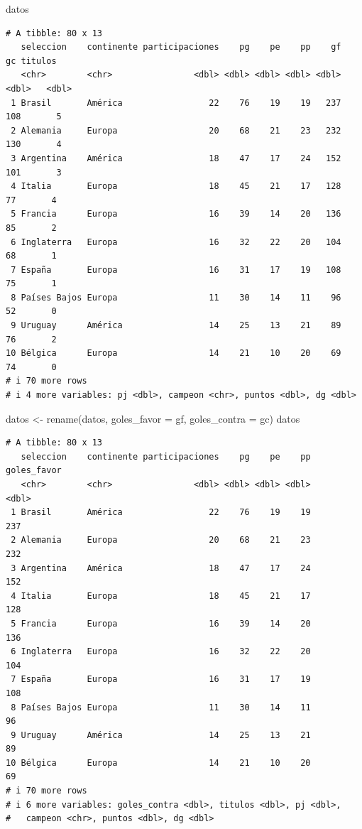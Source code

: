 \documentclass[
]{book}
\newenvironment{Shaded}{\begin{snugshade}}{\end{snugshade}}
\newcommand{\AttributeTok}[1]{\textcolor[rgb]{0.77,0.63,0.00}{#1}}
\newcommand{\FunctionTok}[1]{\textcolor[rgb]{0.00,0.00,0.00}{#1}}
\newcommand{\NormalTok}[1]{#1}
\newcommand{\OtherTok}[1]{\textcolor[rgb]{0.56,0.35,0.01}{#1}}
\begin{document}
\begin{Shaded}
\begin{Highlighting}[]
\NormalTok{datos}
\end{Highlighting}
\end{Shaded}

\begin{verbatim}
# A tibble: 80 x 13
   seleccion    continente participaciones    pg    pe    pp    gf    gc titulos
   <chr>        <chr>                <dbl> <dbl> <dbl> <dbl> <dbl> <dbl>   <dbl>
 1 Brasil       América                 22    76    19    19   237   108       5
 2 Alemania     Europa                  20    68    21    23   232   130       4
 3 Argentina    América                 18    47    17    24   152   101       3
 4 Italia       Europa                  18    45    21    17   128    77       4
 5 Francia      Europa                  16    39    14    20   136    85       2
 6 Inglaterra   Europa                  16    32    22    20   104    68       1
 7 España       Europa                  16    31    17    19   108    75       1
 8 Países Bajos Europa                  11    30    14    11    96    52       0
 9 Uruguay      América                 14    25    13    21    89    76       2
10 Bélgica      Europa                  14    21    10    20    69    74       0
# i 70 more rows
# i 4 more variables: pj <dbl>, campeon <chr>, puntos <dbl>, dg <dbl>
\end{verbatim}

\begin{Shaded}
\begin{Highlighting}[]
\NormalTok{datos }\OtherTok{\textless{}{-}} \FunctionTok{rename}\NormalTok{(datos, }\AttributeTok{goles\_favor =}\NormalTok{ gf, }\AttributeTok{goles\_contra =}\NormalTok{ gc)}
\NormalTok{datos}
\end{Highlighting}
\end{Shaded}

\begin{verbatim}
# A tibble: 80 x 13
   seleccion    continente participaciones    pg    pe    pp goles_favor
   <chr>        <chr>                <dbl> <dbl> <dbl> <dbl>       <dbl>
 1 Brasil       América                 22    76    19    19         237
 2 Alemania     Europa                  20    68    21    23         232
 3 Argentina    América                 18    47    17    24         152
 4 Italia       Europa                  18    45    21    17         128
 5 Francia      Europa                  16    39    14    20         136
 6 Inglaterra   Europa                  16    32    22    20         104
 7 España       Europa                  16    31    17    19         108
 8 Países Bajos Europa                  11    30    14    11          96
 9 Uruguay      América                 14    25    13    21          89
10 Bélgica      Europa                  14    21    10    20          69
# i 70 more rows
# i 6 more variables: goles_contra <dbl>, titulos <dbl>, pj <dbl>,
#   campeon <chr>, puntos <dbl>, dg <dbl>
\end{verbatim}
\end{document}
